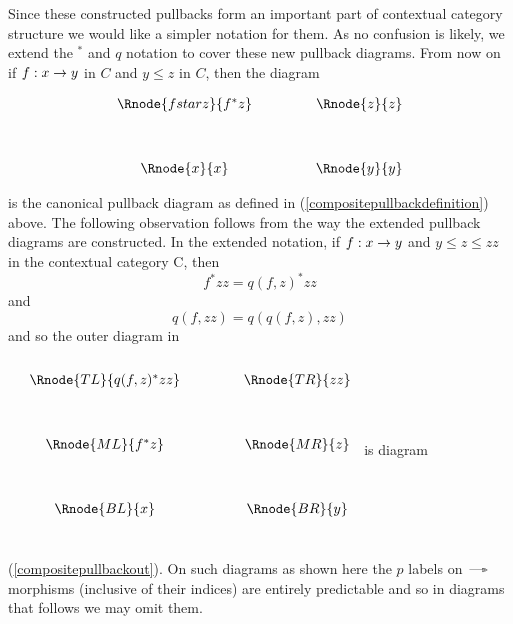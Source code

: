 Since these constructed pullbacks form an important part of contextual
category structure we would like a simpler notation for them. As no confusion is
likely, we extend the $^*$ and $q$ notation to cover these new pullback diagrams.
From now on if $f:x \rightarrow y$ in $C$ and $y \leq z$ in $C$, then the diagram

\vspace{3mm}
\begin{center}
\begin{equation}
\label{compositepullbackout}
\begin{array}{cp{.9cm}c}
\Rnode{fstarz}{f^*z} & & \Rnode{z}{z}\\ [1.2cm]
\Rnode{x}{x}         & & \Rnode{y}{y}
\end{array}
\end{equation}
\end{center}
is the canonical pullback diagram as defined in (\ref{compositepullbackdefinition}) above. 
\note
The following observation
follows from the way the extended pullback diagrams are constructed. 
In the extended notation, if $f: x \rightarrow y$ 
and $y \leq z \leq zz$ in the contextual category C, then
\begin{equation}
f^*zz = q(f, z)^*zz
\end{equation}
 and 
\begin{equation}
q(f, zz) = q(q(f, z), zz)
\end{equation}
and so the outer diagram in
\renewcommand{\pc}[2]{p_{#1,#2}}  %
$
\begin{array}{ccp{.9cm}c}
\\[0.25cm]
&\Rnode{TL}{q(f,z)^*zz} & & \Rnode{TR}{zz}\\ [1.2cm]
&\Rnode{ML}{f^*z} & & \Rnode{MR}{z}\\ [1.2cm]
&\Rnode{BL}{x}         & & \Rnode{BR}{y} \\[1.0cm]
\end{array}
$
is diagram (\ref{compositepullbackout}). 
On such diagrams as shown here the $p$ labels on $\dmorph$ morphisms (inclusive of their indices) are entirely predictable  and so in diagrams that follows we may omit them.


